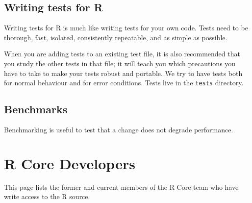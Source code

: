 \documentclass[
]{book}
\begin{document}
\section{Writing tests for R}\label{writing-tests-for-r}

Writing tests for R is much like writing tests for your own code. Tests need to be thorough, fast, isolated, consistently repeatable, and as simple as possible.

When you are adding tests to an existing test file, it is also recommended that you study the other tests in that file; it will teach you which precautions you have to take to make your tests robust and portable. We try to have tests both for normal behaviour and for error conditions. Tests live in the \texttt{tests} directory.

\section{Benchmarks}\label{benchmarks}

Benchmarking is useful to test that a change does not degrade performance.

\chapter{R Core Developers}\label{CoreDev}

This page lists the former and current members of the R Core team who have write access to the R source.
\end{document}
